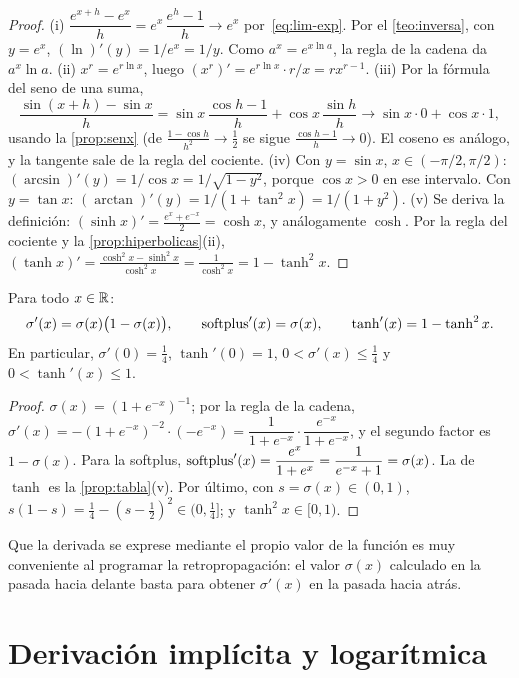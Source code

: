 \begin{proof}
(i) $\dfrac{e^{x+h}-e^{x}}{h}=e^{x}\,\dfrac{e^{h}-1}{h}\to e^{x}$ por~\eqref{eq:lim-exp}. Por el \cref{teo:inversa}, con $y=e^{x}$, $(\ln)'(y)=1/e^{x}=1/y$. Como $a^{x}=e^{x\ln a}$, la regla de la cadena da $a^{x}\ln a$.
(ii) $x^{r}=e^{r\ln x}$, luego $(x^{r})'=e^{r\ln x}\cdot r/x=rx^{r-1}$.
(iii) Por la fórmula del seno de una suma,
\[
\frac{\sin(x+h)-\sin x}{h}=\sin x\,\frac{\cos h-1}{h}+\cos x\,\frac{\sin h}{h}\longrightarrow\sin x\cdot0+\cos x\cdot1,
\]
usando la \cref{prop:senx} (de $\frac{1-\cos h}{h^{2}}\to\frac12$ se sigue $\frac{\cos h-1}{h}\to0$). El coseno es análogo, y la tangente sale de la regla del cociente.
(iv) Con $y=\sin x$, $x\in(-\pi/2,\pi/2)$: $(\arcsin)'(y)=1/\cos x=1/\sqrt{1-y^{2}}$, porque $\cos x>0$ en ese intervalo. Con $y=\tan x$: $(\arctan)'(y)=1/(1+\tan^{2}x)=1/(1+y^{2})$.
(v) Se deriva la definición: $(\sinh x)'=\frac{e^{x}+e^{-x}}{2}=\cosh x$, y análogamente $\cosh$. Por la regla del cociente y la \cref{prop:hiperbolicas}(ii), $(\tanh x)'=\frac{\cosh^{2}x-\sinh^{2}x}{\cosh^{2}x}=\frac{1}{\cosh^{2}x}=1-\tanh^{2}x$.
\end{proof}

\begin{proposicion}\label{prop:derivadas-activaciones}
Para todo $x\in\mathbb{R}$:
\[
\sigma'(x)=\sigma(x)\bigl(1-\sigma(x)\bigr),\qquad \operatorname{softplus}'(x)=\sigma(x),\qquad \tanh'(x)=1-\tanh^{2}x.
\]
En particular, $\sigma'(0)=\tfrac14$, $\tanh'(0)=1$, $0<\sigma'(x)\le\tfrac14$ y $0<\tanh'(x)\le1$.
\end{proposicion}

\begin{proof}
$\sigma(x)=(1+e^{-x})^{-1}$; por la regla de la cadena, $\sigma'(x)=-(1+e^{-x})^{-2}\cdot(-e^{-x})=\dfrac{1}{1+e^{-x}}\cdot\dfrac{e^{-x}}{1+e^{-x}}$, y el segundo factor es $1-\sigma(x)$. Para la softplus, $\operatorname{softplus}'(x)=\dfrac{e^{x}}{1+e^{x}}=\dfrac{1}{e^{-x}+1}=\sigma(x)$. La de $\tanh$ es la \cref{prop:tabla}(v). Por último, con $s=\sigma(x)\in(0,1)$, $s(1-s)=\tfrac14-(s-\tfrac12)^{2}\in(0,\tfrac14]$; y $\tanh^{2}x\in[0,1)$.
\end{proof}

Que la derivada se exprese mediante el propio valor de la función es muy conveniente al programar la retropropagación: el valor $\sigma(x)$ calculado en la pasada hacia delante basta para obtener $\sigma'(x)$ en la pasada hacia atrás.

\section{Derivación implícita y logarítmica}

